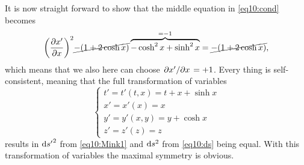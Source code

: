 \documentclass[11pt,a4paper, 
swedish, english %
]{article}
\begin{document}
It is now straight forward to show that the middle equation in
\eqref{eq10:cond} becomes
\begin{equation}
\qty(\pdv{x'}{x})^2
\cancel{-(1+2\cosh x)}
\overbrace{-\cosh^2 x+\sinh^2x}^{=-1}
=\cancel{-(1+2\cosh x)},
\end{equation}
which means that we also here can choose $\pdv*{x'}{x}=+1$. Every
thing is self-consistent, meaning that the full transformation of
variables 
\begin{equation}
\begin{cases}
t'=t'(t,x)=t+x+\sinh x\\
x'=x'(x)=x\\
y'=y'(x,y)=y+\cosh x\\
z'=z'(z)=z
\end{cases}
\end{equation}
results in $\mathrm{d}{s'}^2$ from \eqref{eq10:Mink1} and $\mathrm{d}{s}^2$ from
\eqref{eq10:ds} being equal. With this transformation of variables
the maximal symmetry is obvious.
\end{document}
